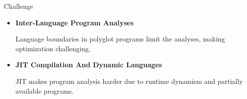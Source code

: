 \begin{roundedalertblock}{Challenge}
    \vspace{5mm}

    \begin{itemize}
        \vspace{3mm}
        \item \textbf{Inter-Language Program Analyses}\par
            \vspace{6mm}
            Language boundaries in polyglot programs limit the analyses, making optimization challenging.
        \vspace{8mm}

        \item \textbf{JIT Compilation And Dynamic Languages}\par
        \vspace{6mm}
        JIT makes program analysis harder due to runtime dynamism and partially available programs.\par
    \end{itemize}
    \vspace{3mm}


\end{roundedalertblock}
